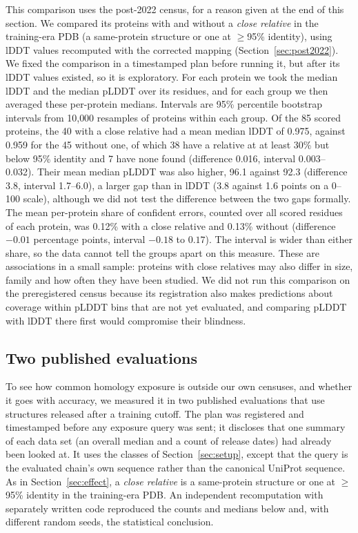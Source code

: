\documentclass{article}
\begin{document}
This comparison uses the post-2022 census, for a reason given at the end
of this section. We compared its proteins with and without a \emph{close
relative} in the training-era PDB (a same-protein structure or one at
$\ge$95\% identity), using lDDT values recomputed with the corrected mapping
(Section~\ref{sec:post2022}). We fixed the comparison in a timestamped plan
before running it, but after its lDDT values existed, so it is exploratory.
For each protein we took the median lDDT and the median pLDDT over its
residues, and for each group we then averaged these per-protein medians.
Intervals are 95\% percentile bootstrap intervals from 10{,}000 resamples of
proteins within each group. Of the 85 scored proteins, the 40 with a close
relative had a mean median lDDT of 0.975, against 0.959 for the 45 without one, of which 38 have a relative at at least 30\% but below 95\% identity and 7 have none found (difference 0.016, interval 0.003--0.032). Their mean median pLDDT was
also higher, 96.1 against 92.3 (difference 3.8, interval 1.7--6.0), a larger
gap than in lDDT (3.8 against 1.6 points on a 0--100 scale), although we did
not test the difference between the two gaps formally. The mean per-protein share of confident errors, counted over all scored residues of each protein, was 0.12\% with a close relative and 0.13\% without
(difference $-0.01$ percentage points, interval $-0.18$ to $0.17$). The
interval is wider than either share, so the data cannot tell the groups
apart on this measure. These are associations in a small sample: proteins with close relatives may also differ in size, family and how often they have been studied. We did not run this comparison on the preregistered
census because its registration also makes predictions about coverage within
pLDDT bins that are not yet evaluated, and comparing pLDDT with lDDT there
first would compromise their blindness.

\subsection{Two published evaluations}
\label{sec:published}

To see how common homology exposure is outside our own censuses, and
whether it goes with accuracy, we measured it in two published evaluations
that use structures released after a training cutoff. The plan was registered
and timestamped before any exposure query was sent; it discloses that one
summary of each data set (an overall median and a count of release dates) had
already been looked at. It uses the classes of Section~\ref{sec:setup}, except
that the query is the evaluated chain's own sequence rather than the
canonical UniProt sequence. As in Section~\ref{sec:effect}, a \emph{close
relative} is a same-protein structure or one at $\ge$95\% identity in the
training-era PDB. An independent recomputation with separately written code
reproduced the counts and medians below and, with different random seeds,
the statistical conclusion.
\end{document}

